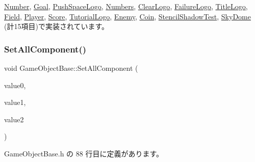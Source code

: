 \mbox{\hyperlink{class_number_a7c6facdb1b3d0acc8309e0a915863d44}{Number}}, \mbox{\hyperlink{class_goal_a98b797c8012ab43d6fc8c42e4e91466b}{Goal}}, \mbox{\hyperlink{class_push_space_logo_afa163b1aff8df494b4f09f378bf983f0}{Push\+Space\+Logo}}, \mbox{\hyperlink{class_numbers_a1ab67e439ba1695c8fd545dfc1650990}{Numbers}}, \mbox{\hyperlink{class_clear_logo_aa19369cbace0cc79957ef7b4d4dbd0f5}{Clear\+Logo}}, \mbox{\hyperlink{class_failure_logo_a542b1617087a6701f7edb345e2a72e01}{Failure\+Logo}}, \mbox{\hyperlink{class_title_logo_a8bca39d06592b95b26024c2d86ac349c}{Title\+Logo}}, \mbox{\hyperlink{class_field_a5b140074dcca821ac702da348238c6d4}{Field}}, \mbox{\hyperlink{class_player_a457153d0edd58932e37e1356f5fe5fed}{Player}}, \mbox{\hyperlink{class_score_ad01d461a2b6ca345858b2ae0a3d81cc1}{Score}}, \mbox{\hyperlink{class_tutorial_logo_a2c9e22c81cfeafbd34f50cc766a66cf1}{Tutorial\+Logo}}, \mbox{\hyperlink{class_enemy_ab86571061e7fcabcf8c646b1abad5581}{Enemy}}, \mbox{\hyperlink{class_coin_a52c50229ce7c1e0f459e198adac70c8d}{Coin}}, \mbox{\hyperlink{class_stencil_shadow_test_a7691120143c64b99d6c8f5391be56e83}{Stencil\+Shadow\+Test}}, \mbox{\hyperlink{class_sky_dome_abc6f8ed1471d7b03f25924a849cae590}{Sky\+Dome}} (計15項目)で実装されています。

\mbox{\label{class_game_object_base_aad0e581dfba83d11af6412a0df6ecd90}} 
\subsubsection{\texorpdfstring{Set\+All\+Component()}{SetAllComponent()}}
{\footnotesize\ttfamily void Game\+Object\+Base\+::\+Set\+All\+Component (\begin{DoxyParamCaption}\item[{\mbox{\hyperlink{class_update_base}{Update\+Base}} $\ast$}]{value0,  }\item[{\mbox{\hyperlink{class_draw_base}{Draw\+Base}} $\ast$}]{value1,  }\item[{\mbox{\hyperlink{class_collision_base}{Collision\+Base}} $\ast$}]{value2 }\end{DoxyParamCaption})\hspace{0.3cm}{\ttfamily [inline]}}



 Game\+Object\+Base.\+h の 88 行目に定義があります。

